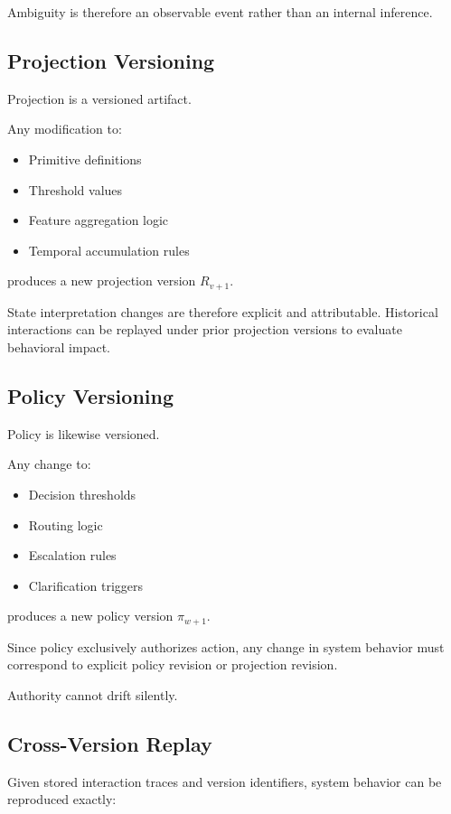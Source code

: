 \documentclass[11pt]{article}
\begin{document}
Ambiguity is therefore an observable event rather than an internal inference.

\subsection{Projection Versioning}

Projection is a versioned artifact.

Any modification to:

\begin{itemize}
  \item Primitive definitions
  \item Threshold values
  \item Feature aggregation logic
  \item Temporal accumulation rules
\end{itemize}

produces a new projection version $R_{v+1}$.

State interpretation changes are therefore explicit and attributable. Historical interactions can be replayed under prior projection versions to evaluate behavioral impact.

\subsection{Policy Versioning}

Policy is likewise versioned.

Any change to:

\begin{itemize}
  \item Decision thresholds
  \item Routing logic
  \item Escalation rules
  \item Clarification triggers
\end{itemize}

produces a new policy version $\pi_{w+1}$.

Since policy exclusively authorizes action, any change in system behavior must correspond to explicit policy revision or projection revision.

Authority cannot drift silently.

\subsection{Cross-Version Replay}

Given stored interaction traces and version identifiers, system behavior can be reproduced exactly:
\end{document}
